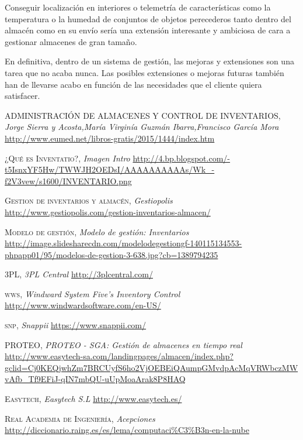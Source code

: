 \documentclass[a4paper,11pt]{book}
\begin{document}
Conseguir localización en interiores  o telemetría de características como la temperatura o la humedad de conjuntos de objetos perecederos tanto dentro del almacén como en su envío sería una extensión interesante y ambiciosa de cara a gestionar almacenes de gran tamaño. 

En definitiva, dentro de un sistema de gestión, las mejoras y extensiones son una tarea que no acaba nunca. Las posibles extensiones o mejoras futuras también han de llevarse acabo en función de las necesidades que el cliente quiera satisfacer. 

\begin{thebibliography}{aaaa}



 \textsc{ADMINISTRACIÓN DE ALMACENES Y CONTROL DE INVENTARIOS},
\textit{Jorge Sierra y Acosta,María Virginía Guzmán Ibarra,Francisco García Mora}
\url{http://www.eumed.net/libros-gratis/2015/1444/index.htm} 

 \textsc{¿Qué es Inventatio?},
\textit{Imagen Intro}
\url{http://4.bp.blogspot.com/-t5IsnxYF5Hw/TWWJH2OEDsI/AAAAAAAAAAs/Wk_-f2V3vew/s1600/INVENTARIO.png} 


 \textsc{Gestion de inventarios y almacén},
\textit{Gestiopolis}
\url{http://www.gestiopolis.com/gestion-inventarios-almacen/} 


 \textsc{Modelo de gestión},
\textit{Modelo de gestión: Inventarios}
\url{http://image.slidesharecdn.com/modelodegestiongf-140115134553-phpapp01/95/modelos-de-gestion-3-638.jpg?cb=1389794235}

 \textsc{3PL},
\textit{3PL Central}
\url{http://3plcentral.com/} 

 \textsc{wws},
\textit{Windward System Five's Inventory Control}
\url{http://www.windwardsoftware.com/en-US/}

 \textsc{snp},
\textit{Snappii}
\url{https://www.snappii.com/}

 \textsc{PROTEO},
\textit{PROTEO - SGA: Gestión de almacenes en tiempo real}
\url{http://www.easytech-sa.com/landingpages/almacen/index.php?gclid=Cj0KEQjwhZm7BRCUyfS6ho2VjOEBEiQAumpGMvdpAcMqVRWbczMWvAfb_Tf9EFiJ-qIN7mbQU-uUpMoaArak8P8HAQ}

 \textsc{Easytech},
\textit{Easytech S.L}
\url{http://www.easytech.es/}



 \textsc{Real Academia de Ingeniería},
\textit{Acepciones}
\url{http://diccionario.raing.es/es/lema/computaci\%C3\%B3n-en-la-nube}



\end{thebibliography}
\end{document}
